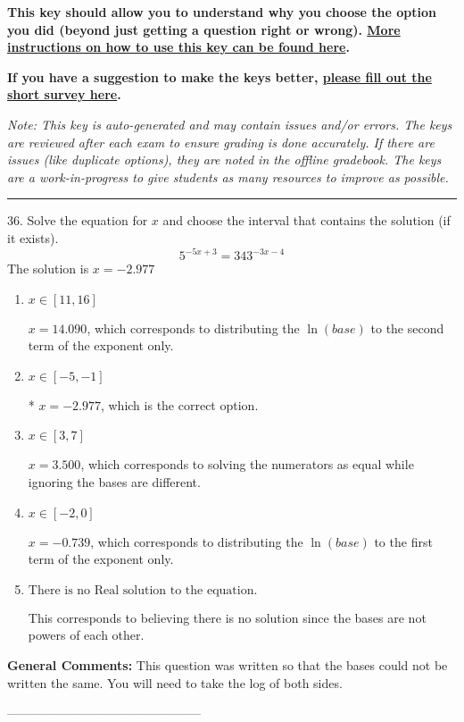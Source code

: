 \documentclass{extbook}[14pt]
\begin{document}
\textbf{This key should allow you to understand why you choose the option you did (beyond just getting a question right or wrong). \href{https://xronos.clas.ufl.edu/mac1105spring2020/courseDescriptionAndMisc/Exams/LearningFromResults}{More instructions on how to use this key can be found here}.}

\textbf{If you have a suggestion to make the keys better, \href{https://forms.gle/CZkbZmPbC9XALEE88}{please fill out the short survey here}.}

\textit{Note: This key is auto-generated and may contain issues and/or errors. The keys are reviewed after each exam to ensure grading is done accurately. If there are issues (like duplicate options), they are noted in the offline gradebook. The keys are a work-in-progress to give students as many resources to improve as possible.}

\rule{\textwidth}{0.4pt}

36. Solve the equation for $x$ and choose the interval that contains the solution (if it exists).
\[ 5^{-5x+3} = 343^{-3x-4} \] 
The solution is $ x = -2.977 $ 

\begin{enumerate}[label=\Alph*.] 
\item $ x \in [11, 16] $ 

 $x = 14.090$, which corresponds to distributing the $\ln(base)$ to the second term of the exponent only. 
\item $ x \in [-5, -1] $ 

 * $x = -2.977$, which is the correct option. 
\item $ x \in [3, 7] $ 

 $x = 3.500$, which corresponds to solving the numerators as equal while ignoring the bases are different. 
\item $ x \in [-2, 0] $ 

 $x = -0.739$, which corresponds to distributing the $\ln(base)$ to the first term of the exponent only. 
\item $ \text{There is no Real solution to the equation.} $ 

 This corresponds to believing there is no solution since the bases are not powers of each other. 
\end{enumerate} 
 
\textbf{General Comments:} This question was written so that the bases could not be written the same. You will need to take the log of both sides.

-----------------------------------------------
\end{document}
